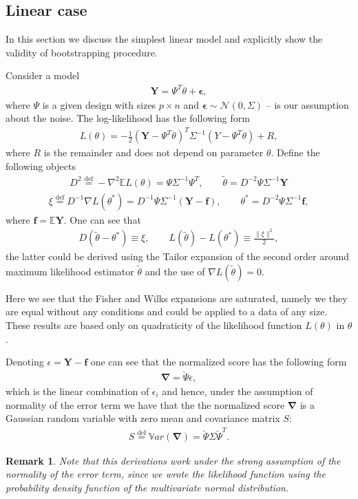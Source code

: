 \documentclass[12pt]{article}
\renewcommand{\=}[1]{\stackrel{#1}{=}} %
\providecommand{\e}{\epsilon}
\newtheorem{re}{Remark}[section]
\begin{document}
\subsection{Linear case} 
In this section we discuss the simplest linear model and explicitly show the validity of bootstrapping procedure. 
\par Consider a model 
\begin{align}\label{linear}
\mathbf{Y} = \Psi^T \theta + \mathbf{\e},
\end{align}
where $\Psi$ is a given design with sizes $p \times n$ and $\mathbf{\e} \sim \mathcal{N}(0, \Sigma)$ -- is our assumption about the noise. The log-likelihood has the following form
\begin{align}\label{p}
L(\theta) = - \frac 1 2 (\mathbf{Y} - \Psi^T \theta)^T \Sigma^{-1} (Y - \Psi^T \theta) + R, 
\end{align}
where $R$ is the remainder and does not depend on parameter $\theta$. Define the following objects 
\begin{align}
D^2 \stackrel{\text{def}}{=} - \nabla^2 \mathbb{E} L(\theta) = \Psi \Sigma^{-1} \Psi^T, \qquad \tilde{\theta} = D^{-2} \Psi \Sigma^{-1} \mathbf{Y}
\end{align}
\begin{align}
\xi \stackrel{\text{def}}{=} D^{-1} \nabla L(\theta^*) = D^{-1} \Psi \Sigma^{-1}(\mathbf{Y} - \mathbf{f}), \qquad {\theta}^* = D^{-2} \Psi \Sigma^{-1} \mathbf{f},
\end{align}
where $\mathbf{f} = \mathbb{E} \mathbf{Y}$. One can see that 
\begin{align}\label{fisher_wilks_linear}
D(\tilde{\theta} - \theta^*) \equiv \xi, \qquad L(\tilde{\theta}) - L(\theta^*) \equiv \frac{\| \xi \|^2}{2},
\end{align}
the latter could be derived using the Tailor expansion of the second order around maximum likelihood estimator $\tilde{\theta}$ and the use of $\nabla L(\tilde{\theta}) = 0$. 
\par Here we see that the Fisher and Wilks expansions are saturated, namely we they are equal without any conditions and could be applied to a data of any size. These results are based only on quadraticity of the likelihood function $L(\theta)$ in $\theta$. 
\par Denoting $\e = \mathbf{Y} - \mathbf{f}$ one can see that the normalized score has the following form 
\begin{align}
\mathbf{\nabla} =  \breve{\Psi} \e,
\end{align}
which is the linear combination of $\e_i$ and hence, under the assumption of normality of the error term we have that the the normalized score $\mathbf{\nabla}$ is a Gaussian random variable with zero mean and covariance matrix $S$:
\begin{align}
S \stackrel{\text{def}}{=} \mathbb{V}ar (\mathbf{\nabla}) = \breve{\Psi} \Sigma \breve{\Psi}^T.
\end{align}
\begin{re}
Note that this derivations work under the strong assumption of the normality of the error term, since we wrote the likelihood function using the probability density function of the multivariate normal distribution.  
\end{re}
\end{document}
